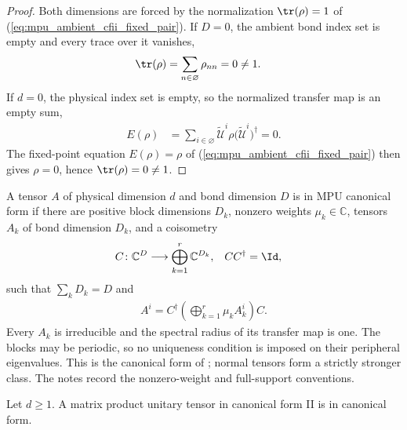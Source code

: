 \begin{proof}\leanok
    Both dimensions are forced by the normalization $\tr(\rho)=1$ of
    (\ref{eq:mpu_ambient_cfii_fixed_pair}). If $D=0$, the ambient bond index
    set is empty and every trace over it vanishes,
    \begin{align}
        \tr(\rho) & =\sum_{n\in\varnothing}\rho_{nn}=0\neq1.
    \end{align}
    If $d=0$, the physical index set is empty, so the normalized transfer map
    is an empty sum,
    \begin{align}
        E(\rho) & =\sum_{i\in\varnothing}\widetilde{\mathcal U}^{i}\rho
        \bigl(\widetilde{\mathcal U}^{i}\bigr)^\dagger=0.
    \end{align}
    The fixed-point equation $E(\rho)=\rho$ of
    (\ref{eq:mpu_ambient_cfii_fixed_pair}) then gives $\rho=0$, hence
    $\tr(\rho)=0\neq1$.
\end{proof}

\begin{definition}
    \label{def:mpu_canonical_form}
    \leanok
    A tensor $A$ of physical dimension $d$ and bond dimension $D$ is in MPU
    canonical form if there are positive block dimensions $D_k$, nonzero
    weights $\mu_k\in\mathbb C$, tensors $A_k$ of bond dimension $D_k$, and a
    coisometry
    \begin{align}
        C\colon\mathbb C^D                & \longrightarrow
        \bigoplus_{k=1}^r\mathbb C^{D_k}, &
        CC^\dagger                        & =\Id,
    \end{align}
    such that $\sum_k D_k=D$ and
    \begin{align}
        A^i=C^\dagger\left(\bigoplus_{k=1}^r\mu_k A_k^i\right)C.
    \end{align}
    Every $A_k$ is irreducible and the spectral radius of its transfer map is
    one. The blocks may be periodic, so no uniqueness condition is imposed on
    their peripheral eigenvalues. This is the canonical form of
    \cite[lines~259--267]{Cirac2017MPU}; normal tensors form a strictly stronger
    class. The notes \cite{gap:mpu_canonical_form_nonzero_weights,gap:mpu_canonical_form_full_support} record the nonzero-weight and full-support
    conventions.
\end{definition}

\begin{lemma}
    \label{thm:mpu_canonical_form_of_cfii}
    \leanok
    Let $d\geq1$. A matrix product unitary tensor in canonical form II is in
    canonical form.
\end{lemma}


